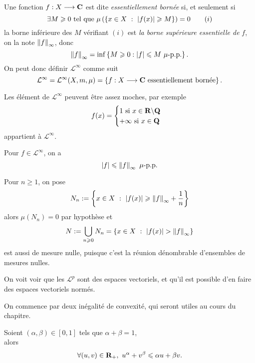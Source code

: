 \documentclass[a4paper,11pt, twoside]{article}
\begin{document}
\begin{Def}
  Une fonction $f:X\longrightarrow\mathbf C$ est dite \emph{essentiellement bornée} si, et seulement si 
$$\exists M\geqslant 0\text{ tel que }\mu\left(\left\{x\in X\ :\ \left| f(x)\right|\geqslant M\right\}\right)=0\qquad (i)$$
la borne inférieure des $M$ vérifiant $(i)$ est \emph{la borne supérieure essentielle de }$f$, on la note $\left\lVert f\right\rVert_{\infty}$, donc 
$$\left\lVert f\right\rVert_\infty=\mathrm{inf}\left\{M\geqslant 0 : \left| f\right|\leqslant M\ \mu\text{-p.p.}\right\}.$$
On peut donc définir $\mathcal L^\infty$ comme suit
$$\mathcal L^\infty=\mathcal L^\infty(X,m,\mu)=\left\{f:X\longrightarrow\mathbf C\text{ essentiellement bornée}\right\}.$$
\end{Def}


\begin{RQ}
Les élément de $\mathcal L^\infty$ peuvent être assez moches, par exemple 
$$f(x)=\begin{cases}
  1\text{ si }x\in\mathbf R\backslash\mathbf Q\\
  +\infty\text{ si }x\in\mathbf Q
\end{cases}$$
appartient à $\mathcal L^\infty$.
\end{RQ}


\begin{RQ}
  Pour $f\in\mathcal L^\infty$, on a 
  $$\abs{f}\leqslant \norm{f}_\infty\ \mu\text{-p.p.}$$
\end{RQ}


\begin{Proof}
  Pour $n\geqslant 1$, on pose 
  $$N_n:=\ens{x\in X\ :\ \abs{f(x)}\geqslant \norm{f}_\infty+\frac1n}$$
  alors $\mu(N_n)=0$ par hypothèse et 
  $$N:=\bigcup_{n\geqslant 0}N_n=\ens{x\in X\ :\ \abs{f(x)}>\norm{f}_\infty}$$
  est aussi de mesure nulle, puisque c'est la réunion dénombrable d'ensembles de mesures nulles.
\end{Proof}


On voit voir que les $\mathcal L^p$ sont des espaces vectoriels, et qu'il est possible d'en faire des espaces vectoriels normés.

On commence par deux inégalité de convexité, qui seront utiles au cours du chapitre.




\begin{prop}
  Soient $(\alpha,\beta)\in[0,1]$ tels que $\alpha+\beta=1$,\\

  alors 
  $$\forall (u,v)\in\R_+,\ u^\alpha+v^\beta\leqslant \alpha u+\beta v.$$
\end{prop}
\end{document}
